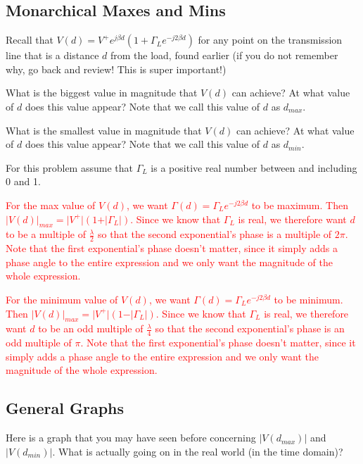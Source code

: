 \documentclass{article}
\begin{document}
\subsection{Monarchical Maxes and Mins}

Recall that $V(d) = V^+ e^{j \beta d} (1 + \Gamma_L e^{-j2\beta d})$ for any point on the transmission line that is a distance $d$ from the load, found earlier (if you do not remember why, go back and review! This is super important!)

What is the biggest value in magnitude that $V(d)$ can achieve? At what value of $d$ does this value appear? Note that we call this value of $d$ as $d_{max}$.

What is the smallest value in magnitude that $V(d)$ can achieve? At what value of $d$ does this value appear? Note that we call this value of $d$ as $d_{min}$.

For this problem assume that $\Gamma_L$ is a positive real number between and including 0 and 1.

\textcolor{red}{For the max value of $V(d)$, we want $\Gamma(d) = \Gamma_L e^{-j2\beta d}$ to be maximum. Then $\vert V(d) \vert_{max} = \vert V^+ \vert (1 + \vert \Gamma_L \vert)$. Since we know that $\Gamma_L$ is real, we therefore want $d$ to be a multiple of $\frac{\lambda}{2}$ so that the second exponential's phase is a multiple of $2 \pi$. Note that the first exponential's phase doesn't matter, since it simply adds a phase angle to the entire expression and we only want the magnitude of the whole expression.}

\textcolor{red}{For the minimum value of $V(d)$, we want $\Gamma(d) = \Gamma_L e^{-j2\beta d}$ to be minimum. Then $\vert V(d) \vert_{max} = \vert V^+ \vert (1 - \vert \Gamma_L \vert)$. Since we know that $\Gamma_L$ is real, we therefore want $d$ to be an odd multiple of $\frac{\lambda}{4}$ so that the second exponential's phase is an odd multiple of $\pi$. Note that the first exponential's phase doesn't matter, since it simply adds a phase angle to the entire expression and we only want the magnitude of the whole expression.}

\vfill
\newpage

\subsection{General Graphs}

Here is a graph that you may have seen before concerning $\vert V(d_{max}) \vert$ and $\vert V(d_{min}) \vert$. What is actually going on in the real world (in the time domain)?
\end{document}
